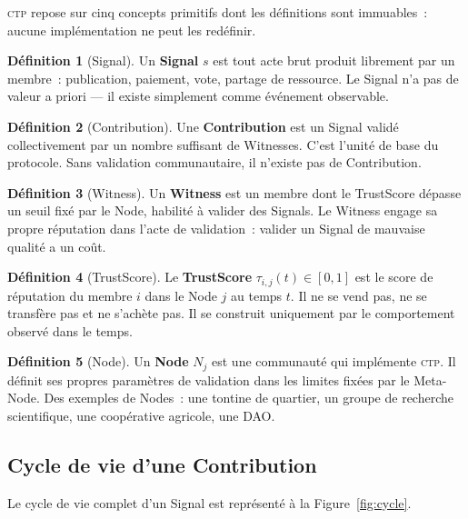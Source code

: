 \documentclass[12pt,a4paper]{article}
\theoremstyle{definition}
\newtheorem{definition}{Définition}[section]
\theoremstyle{plain}
\theoremstyle{remark}
\newcommand{\CTP}{\textsc{ctp}}
\newcommand{\trustscore}{\tau}
\newcommand{\1}{\mathbf{1}}
\begin{document}
\CTP{} repose sur cinq concepts primitifs dont les définitions sont
immuables~: aucune implémentation ne peut les redéfinir.

\begin{definition}[Signal]
Un \textbf{Signal} $s$ est tout acte brut produit librement par un membre~:
publication, paiement, vote, partage de ressource. Le Signal n'a pas de valeur
a priori --- il existe simplement comme événement observable.
\end{definition}

\begin{definition}[Contribution]
Une \textbf{Contribution} est un Signal validé collectivement par un nombre
suffisant de Witnesses. C'est l'unité de base du protocole. Sans validation
communautaire, il n'existe pas de Contribution.
\end{definition}

\begin{definition}[Witness]
Un \textbf{Witness} est un membre dont le TrustScore dépasse un seuil fixé par
le Node, habilité à valider des Signals. Le Witness engage sa propre réputation
dans l'acte de validation~: valider un Signal de mauvaise qualité a un coût.
\end{definition}

\begin{definition}[TrustScore]
Le \textbf{TrustScore} $\trustscore_{i,j}(t) \in [0,1]$ est le score de
réputation du membre $i$ dans le Node $j$ au temps $t$. Il ne se vend pas, ne
se transfère pas et ne s'achète pas. Il se construit uniquement par le
comportement observé dans le temps.
\end{definition}

\begin{definition}[Node]
Un \textbf{Node} $N_j$ est une communauté qui implémente \CTP{}. Il définit
ses propres paramètres de validation dans les limites fixées par le Meta-Node.
Des exemples de Nodes~: une tontine de quartier, un groupe de recherche
scientifique, une coopérative agricole, une DAO.
\end{definition}

\subsection{Cycle de vie d'une Contribution}

Le cycle de vie complet d'un Signal est représenté à la
Figure~\ref{fig:cycle}.
\end{document}
